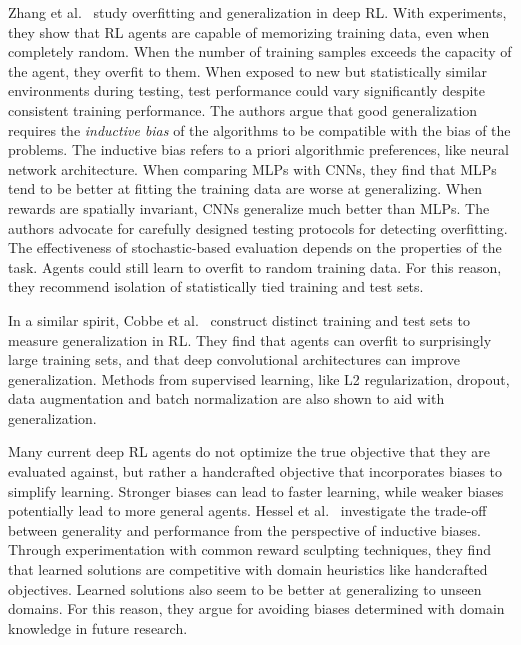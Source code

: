 Zhang et al.~\cite{zhang_study_2018} study overfitting and generalization in deep RL.
With experiments, they show that RL agents are capable of memorizing training data, even when completely random.
When the number of training samples exceeds the capacity of the agent, they overfit to them.
When exposed to new but statistically similar environments during testing, test performance could vary significantly despite consistent training performance.
The authors argue that good generalization requires the \textit{inductive bias} of the algorithms to be compatible with the bias of the problems.
The inductive bias refers to a priori algorithmic preferences, like neural network architecture.
When comparing MLPs with CNNs, they find that MLPs tend to be better at fitting the training data are worse at generalizing.
When rewards are spatially invariant, CNNs generalize much better than MLPs.
The authors advocate for carefully designed testing protocols for detecting overfitting.
The effectiveness of stochastic-based evaluation depends on the properties of the task.
Agents could still learn to overfit to random training data. 
For this reason, they recommend isolation of statistically tied training and test sets.

In a similar spirit, Cobbe et al.~\cite{cobbe_quantifying_2019} construct distinct training and test sets to measure generalization in RL.
They find that agents can overfit to surprisingly large training sets, and that deep convolutional architectures can improve generalization.
Methods from supervised learning, like L2 regularization, dropout, data augmentation and batch normalization are also shown to aid with generalization.

Many current deep RL agents do not optimize the true objective that they are evaluated against,
but rather a handcrafted objective that incorporates biases to simplify learning.
Stronger biases can lead to faster learning, while weaker biases potentially lead to more general agents.
Hessel et al.~\cite{hessel_inductive_2019} investigate the trade-off between generality and performance from the perspective of inductive biases.
Through experimentation with common reward sculpting techniques, they find that learned solutions are competitive with domain heuristics like handcrafted objectives.
Learned solutions also seem to be better at generalizing to unseen domains.
For this reason, they argue for avoiding biases determined with domain knowledge in future research.

